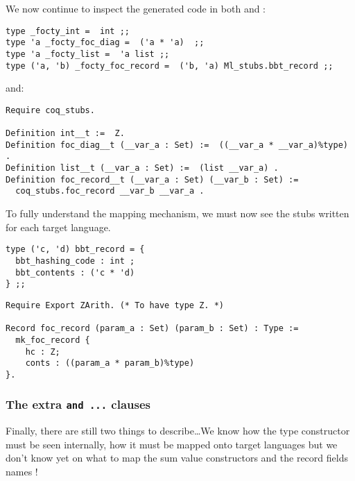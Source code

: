 \medskip
We now continue to inspect the generated code in both \ocaml and \coq:

{\footnotesize
\begin{lstlisting}[language=MyOCaml,
                   title=\ocaml\ code for external definitions (2)]
type _focty_int =  int ;;
type 'a _focty_foc_diag =  ('a * 'a)  ;;
type 'a _focty_list =  'a list ;;
type ('a, 'b) _focty_foc_record =  ('b, 'a) Ml_stubs.bbt_record ;;
\end{lstlisting}}

\noindent and:

{\footnotesize
\begin{lstlisting}[language=MyCoq,
                   title=\coq\ code for external definitions (2)]
Require coq_stubs.

Definition int__t :=  Z.
Definition foc_diag__t (__var_a : Set) :=  ((__var_a * __var_a)%type) .
Definition list__t (__var_a : Set) :=  (list __var_a) .
Definition foc_record__t (__var_a : Set) (__var_b : Set) :=
  coq_stubs.foc_record __var_b __var_a .
\end{lstlisting}}

To fully understand the mapping mechanism, we must now see the stubs
written for each target language.

{\footnotesize
\begin{lstlisting}[frameround=fttt, frame=trBL, language=MyOCaml,
                   title=Stub file ml\_stubs.ml]
type ('c, 'd) bbt_record = {
  bbt_hashing_code : int ;
  bbt_contents : ('c * 'd)
} ;;
\end{lstlisting}}

{\footnotesize
\begin{lstlisting}[frameround=fttt, frame=trBL,
                   language=MyCoq, title=Stub file coq\_stubs.v]
Require Export ZArith. (* To have type Z. *)

Record foc_record (param_a : Set) (param_b : Set) : Type :=
  mk_foc_record {
    hc : Z;
    conts : ((param_a * param_b)%type)
}.
\end{lstlisting}}


\subsubsection{The extra {\tt and ...} clauses}
\label{external-ty-def-extra-clauses}
Finally, there are still two things to describe\ldots We know how the
type constructor must be seen internally, how it must be mapped onto
target languages but we don't know yet on what to map the sum value
constructors and the record fields names !

